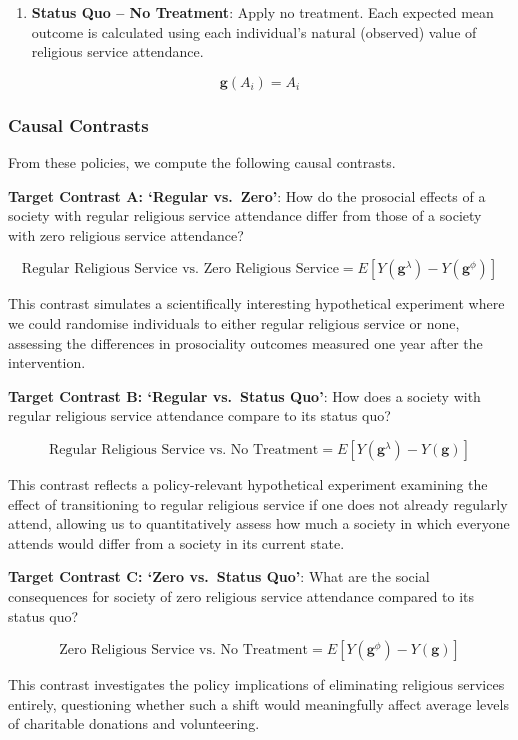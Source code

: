\documentclass[
  single column]{article}
\providecommand{\tightlist}{%
  \setlength{\itemsep}{0pt}\setlength{\parskip}{0pt}}\usepackage{longtable,booktabs,array}
\begin{document}
\begin{enumerate}
\def\labelenumi{\arabic{enumi}.}
\setcounter{enumi}{2}
\tightlist
\item
  \textbf{Status Quo -- No Treatment}: Apply no treatment. Each expected
  mean outcome is calculated using each individual's natural (observed)
  value of religious service attendance.
\end{enumerate}

\[
\mathbf{g}(A_i) =A_i
\]

\subsubsection{Causal Contrasts}\label{causal-contrasts}

From these policies, we compute the following causal contrasts.

\textbf{Target Contrast A: `Regular vs.~Zero'}: How do the prosocial
effects of a society with regular religious service attendance differ
from those of a society with zero religious service attendance?

\[ \text{Regular Religious Service vs. Zero Religious Service} = E[Y(\mathbf{g}^\lambda) - Y(\mathbf{g}^\phi)] \]

This contrast simulates a scientifically interesting hypothetical
experiment where we could randomise individuals to either regular
religious service or none, assessing the differences in prosociality
outcomes measured one year after the intervention.

\textbf{Target Contrast B: `Regular vs.~Status Quo'}: How does a society
with regular religious service attendance compare to its status quo?

\[ \text{Regular Religious Service vs. No Treatment} = E[Y(\mathbf{g}^\lambda) - Y(\mathbf{g})] \]

This contrast reflects a policy-relevant hypothetical experiment
examining the effect of transitioning to regular religious service if
one does not already regularly attend, allowing us to quantitatively
assess how much a society in which everyone attends would differ from a
society in its current state.

\textbf{Target Contrast C: `Zero vs.~Status Quo'}: What are the social
consequences for society of zero religious service attendance compared
to its status quo?

\[ \text{Zero Religious Service vs. No Treatment} = E[Y(\mathbf{g}^\phi) - Y(\mathbf{g})] \]

This contrast investigates the policy implications of eliminating
religious services entirely, questioning whether such a shift would
meaningfully affect average levels of charitable donations and
volunteering.
\end{document}
